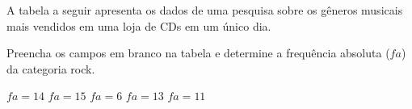 A tabela a seguir apresenta os dados de uma pesquisa sobre os gêneros musicais mais vendidos em uma loja de CDs em um único dia.

    \renewcommand{\arraystretch}{1.3} %

Preencha os campos em branco na tabela e determine a frequência absoluta ($fa$) da categoria rock.

$fa=14$
$fa=15$
$fa=6$
$fa=13$
$fa=11$

